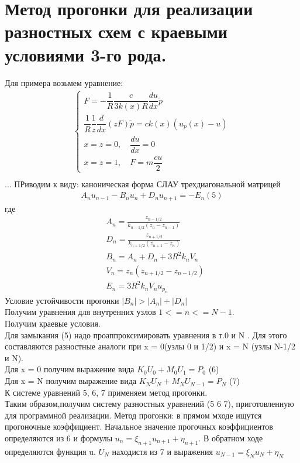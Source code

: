 \documentclass[12pt,a4paper]{article}
\begin{document}
	\section{Метод прогонки для реализации разностных схем с краевыми условиями 3-го рода.}
	Для примера возьмем уравнение:\\
	\begin{align*}
	\begin{cases}
	F = - \dfrac{1}{R}\dfrac{c}{3k(x)R} \dfrac{d u}{dx}\tilde{p}\\
	\dfrac{1}{R}\dfrac{1}{z} \dfrac{d}{dx}(zF)\tilde{p}=c k(x) (u_p(x) - u)\\
	x = z = 0, \quad \dfrac{du}{dx} = 0 \\
	x = z = 1, \quad F = m \dfrac{cu}{2}
	\end{cases}
	\end{align*}
	\begin{align*}
	{}
	\end{align*}
	... ПРиводим к виду: каноническая форма СЛАУ  трехдиагональной матрицей\\
	\begin{align*}
	A_n u_{n-1} - B_n u_n + D_n u_{n+1} = -E_n (5)
	\end{align*}
	где
	\begin{align*}
	&A_n = \frac{z_{n-1/2}}{k_{n-1/2}(z_n -z_{n-1})}\\
	&D_n = \frac{z_{n+1/2}}{k_{n+1/2}(z_{n+1} -z_n)}\\
	&B_n = A_n + D_n + 3R^2 k_n V_n\\
	&V_n = z_n (z_{n+1/2} - z_{n-1/2})\\
	&E_n = 3R^2 k_n V_n u_{p_n}
	\end{align*}
	Условие устойчивости прогонки 
	$|B_n| > |A_n| + |D_n|$\\
	Получим уравнения для внутренних узлов $1<=n <= N-1$.\\
	Получим краевые условия.\\
	Для замыкания (5) надо проаппроксимировать уравнения в т.0 и N . Для этого составляются разностные аналоги при x = 0(узлы 0 и 1/2) и x = N (узлы N-1/2 и N). \\
	Для x = 0 получим выражение вида $K_0 U_0 + M_0 U_1 = P_0$ (6)\\
	Для x = N получим выражение вида $K_N U_N + M_N U_{N-1} = P_N$ (7) \\
	К системе уравнений 5, 6, 7 применяем метод прогонки. \\
	Таким образом,получим систему разностных уравнений (5 6 7), приготовленную для программной реализации. Метод прогонки: в прямом мходе ищутся прогоночные коэффициент. Начальное значение прогочных коэффициентов определяются из 6 и формулы $u_n = \xi_{n+1} u_{n+1} + \eta_{n+1}$. В обратном ходе определяются функция u. $U_N$ находистя из 7 и выражения $u_{N-1} = \xi_N u_N + \eta_N$
\end{document}
